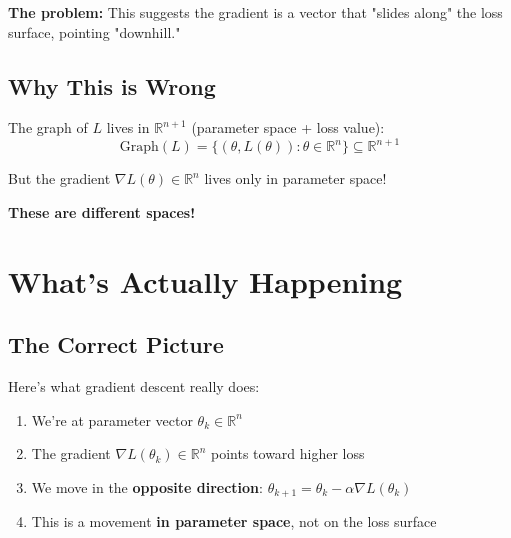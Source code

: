 \begin{notechapter}
\begin{center}
\end{center}

\textbf{The problem:} This suggests the gradient is a vector that "slides along" the loss surface, pointing "downhill."

\subsection{Why This is Wrong}

The graph of $L$ lives in $\mathbb{R}^{n+1}$ (parameter space + loss value):
\[
\text{Graph}(L) = \{(\theta, L(\theta)) : \theta \in \mathbb{R}^n\} \subseteq \mathbb{R}^{n+1}
\]

But the gradient $\nabla L(\theta) \in \mathbb{R}^n$ lives only in parameter space!

\textbf{These are different spaces!}

\section{What's Actually Happening}

\subsection{The Correct Picture}

Here's what gradient descent really does:

\begin{enumerate}
    \item We're at parameter vector $\theta_k \in \mathbb{R}^n$
    \item The gradient $\nabla L(\theta_k) \in \mathbb{R}^n$ points toward higher loss
    \item We move in the \textbf{opposite direction}: $\theta_{k+1} = \theta_k - \alpha \nabla L(\theta_k)$
    \item This is a movement \textbf{in parameter space}, not on the loss surface
\end{enumerate}


\end{notechapter}
